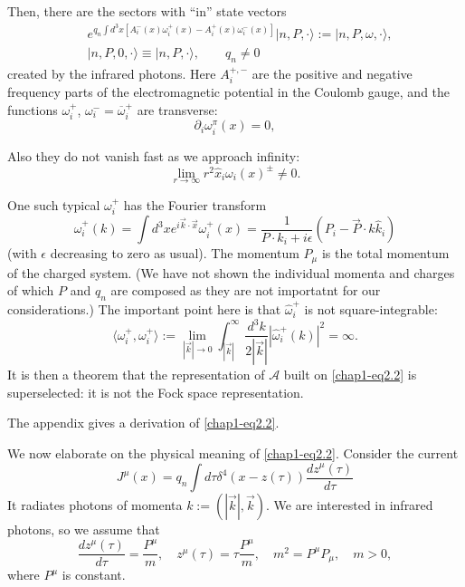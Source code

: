 Then, there are the sectors with ``in'' state vectors \cite{key4}
\begin{align}
& e^{q_{n}\int d^{3}x[A^{-}_{i}(x)\omega^{+}_{i}(x)-A^{+}_{i}(x)\omega^{-}_{i}(x)]}|n,P,\cdot\rangle := |n,P,\omega,\cdot\rangle,\label{chap1-eq2.2}\\
& |n,P,0,\cdot\rangle \equiv |n,P,\cdot\rangle,\qquad q_{n}\neq 0\label{chap1-eq2.3}
\end{align}
created by the infrared photons. Here $A^{+, -}_{i}$ are the positive and negative frequency parts of the electromagnetic potential in the Coulomb gauge, and the functions $\omega^{+}_{i}$, $\omega^{-}_{i}=\overline{\omega}^{+}_{i}$ are transverse:
\begin{equation}
\partial_{i}\omega^{\pi}_{i}(x)=0,\label{chap1-eq2.4}
\end{equation}

Also they do not vanish fast as we approach infinity:
\begin{equation}
\lim\limits_{r\to\infty}r^{2}\hat{x}_{i}\omega_{i}(x)^{\pm}\neq 0.\label{chap1-eq2.5}
\end{equation}

One such typical $\omega^{+}_{i}$ has the Fourier transform
\begin{equation}
\hat{\omega}_{i}^{+}(k)=\int d^{3}xe^{i\overrightarrow{k}\cdot \overrightarrow{x}}\omega^{+}_{i}(x)=\frac{1}{P\cdot k_{i}+i{\epsilon}}(P_{i}-\overrightarrow{P}\cdot \widehat{k}\widehat{k}_{i})\label{chap1-eq2.6}
\end{equation}
(with $\epsilon$ decreasing to zero as usual). The momentum $P_{\mu}$ is the total momentum of the charged system. (We have not shown the individual momenta and charges of which $P$ and $q_{n}$ are composed as they are not importatnt for our considerations.) The important point here is that $\widehat{\omega}^{+}_{i}$ is not square-integrable:
\begin{equation}
\langle \omega_{i}^{+},\omega_{i}^{+}\rangle := \lim\limits_{|\overrightarrow{k}|\to 0}\int^{\infty}_{|\overrightarrow{k}|}\frac{d^{3}k}{2|\overrightarrow{k}|}|\widehat{\omega}_{i}^{+}(k)|^{2}=\infty.\label{chap1-eq2.7}
\end{equation}
It is then a theorem \cite{key6} that the representation of $\mathcal{A}$ built on \eqref{chap1-eq2.2} is superselected: it is not the Fock space representation.

The appendix gives a derivation of \eqref{chap1-eq2.2}.

We now elaborate on the physical meaning of \eqref{chap1-eq2.2}. Consider the current
\begin{equation}
J^{\mu}(x)=q_{n}\int d\tau \delta^{4}(x-z(\tau))\frac{dz^{\mu}(\tau)}{d\tau}\label{chap1-eq2.8}
\end{equation}
It radiates photons of momenta $k := (| \overrightarrow{k}|, \overrightarrow{k})$. We are interested in infrared photons, so we assume that
\begin{equation}
\frac{dz^{\mu}(\tau)}{d\tau}=\dfrac{P^{\mu}}{m},\quad z^{\mu}(\tau)=\tau\frac{P^{\mu}}{m},\quad m^{2}=P^{\mu}P_{\mu},\quad m>0,\label{chap1-eq2.9}
\end{equation}
where $P^{\mu}$ is constant.


